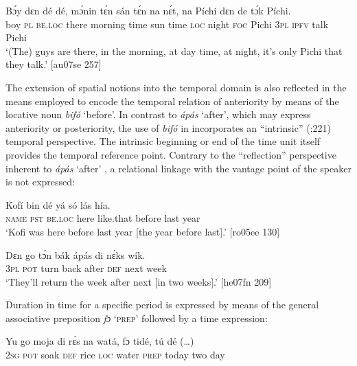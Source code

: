 \ea%
    \label{ex:key:1020}
    \gll Bɔ́y  dɛn  dé    dé,    mɔ́nin  tɛ́n    sán  tɛ́n    na  nɛ́t,  
na  Píchi  dɛn  de  tɔ́k  Píchi.\\
boy  \textsc{pl}  \textsc{be.loc}  there  morning  time    sun  time    \textsc{loc}  night
\textsc{foc}  Pichi  \textsc{3pl}  \textsc{ipfv}  talk  Pichi\\

\glt ‘(The) guys are there, in the morning, at day time, at night, 
it’s only Pichi that they talk.’ [au07se 257]
\z

The extension of spatial notions into the temporal domain is also reflected in the means employed to encode the temporal relation of anteriority by means of the locative noun \textit{bifó} ‘before’. In contrast to \textit{ápás} ‘after’, which may express anteriority or posteriority, the use of \textit{bifó} in  incorporates an “intrinsic” (\citealt{BenderBannardo2005}:221) temporal perspective. The intrinsic beginning or end of the time unit itself provides the temporal reference point. Contrary to the “reflection” perspective inherent to \textit{ápás} ‘after’ , a relational linkage with the vantage point of the speaker is not expressed: 


\ea%
    \label{ex:key:1021}
    \gll Kofí    bin  dé    yá    só        lás  hía. \\
\textsc{name}  \textsc{pst}  \textsc{be.loc}  here    like.that  before  last  year\\

\glt ‘Kofi was here before last year [the year before last].’ [ro05ee 130]
\z


\ea%
    \label{ex:key:1022}
    \gll Dɛn  go  tɔ́n  bák    ápás  di  nɛ́ks    wík.\\
\textsc{3pl}  \textsc{pot}  turn  back  after  \textsc{def}  next    week\\

\glt ‘They’ll return the week after next [in two weeks].’ [he07fn 209]
\z

Duration in time for a specific period is expressed by means of the general associative preposition \textit{fɔ} ‘\textsc{prep}’ followed by a time expression: 


\ea%
    \label{ex:key:1023}
    \gll Yu  go  moja  di  rɛ́s  na  watá,  fɔ  tidé,  tú  dé (…)\\
\textsc{2sg}  \textsc{pot}  soak    \textsc{def}  rice  \textsc{loc}  water  \textsc{prep}  today  two  day\\

